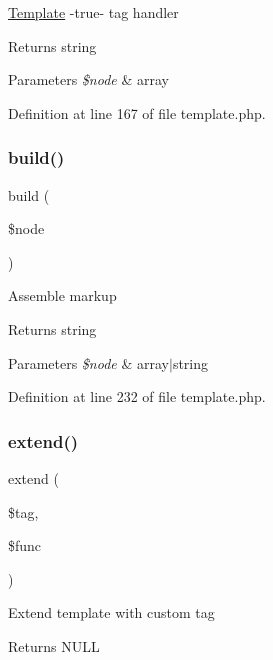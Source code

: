 \hyperlink{class_template}{Template} -\/true-\/ tag handler \begin{DoxyReturn}{Returns}
string 
\end{DoxyReturn}

\begin{DoxyParams}{Parameters}
{\em \$node} & array \\
\hline
\end{DoxyParams}


Definition at line 167 of file template.\+php.

\hypertarget{class_template_a0e9d773ad8306b0d66337606414a443d}{}\label{class_template_a0e9d773ad8306b0d66337606414a443d} 
\subsubsection{\texorpdfstring{build()}{build()}}
{\footnotesize\ttfamily build (\begin{DoxyParamCaption}\item[{}]{\$node }\end{DoxyParamCaption})}

Assemble markup \begin{DoxyReturn}{Returns}
string 
\end{DoxyReturn}

\begin{DoxyParams}{Parameters}
{\em \$node} & array$\vert$string \\
\hline
\end{DoxyParams}


Definition at line 232 of file template.\+php.

\hypertarget{class_template_a441602e9d8e2305bee53a34a10b9fa64}{}\label{class_template_a441602e9d8e2305bee53a34a10b9fa64} 
\subsubsection{\texorpdfstring{extend()}{extend()}}
{\footnotesize\ttfamily extend (\begin{DoxyParamCaption}\item[{}]{\$tag,  }\item[{}]{\$func }\end{DoxyParamCaption})}

Extend template with custom tag \begin{DoxyReturn}{Returns}
N\+U\+LL 
\end{DoxyReturn}

